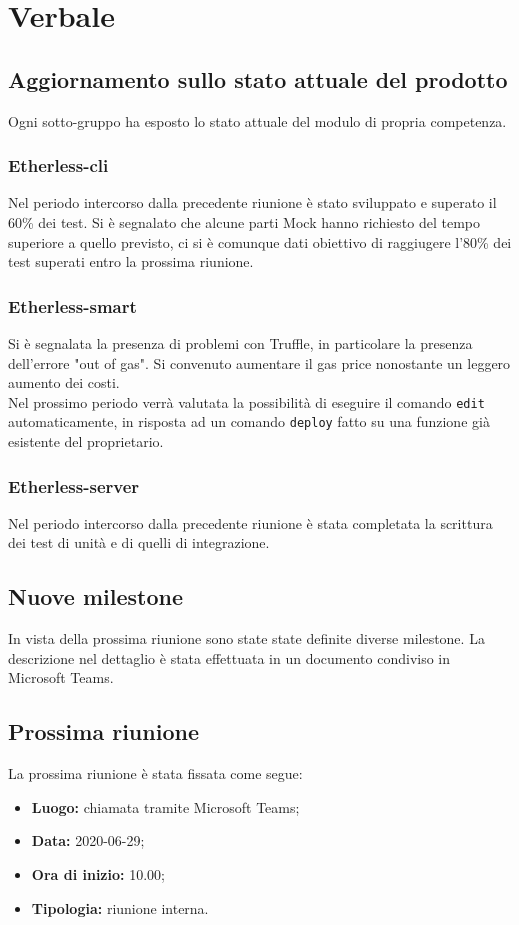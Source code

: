 \section{Verbale}

	\subsection{Aggiornamento sullo stato attuale del prodotto}
		Ogni sotto-gruppo ha esposto lo stato attuale del modulo\textit{} di propria competenza.
		
		\subsubsection{Etherless-cli}
			Nel periodo intercorso dalla precedente riunione è stato sviluppato e superato il 60\% dei test. Si è segnalato che alcune parti Mock\textit{} hanno richiesto del tempo superiore a quello previsto, ci si è comunque dati obiettivo di raggiugere l'80\% dei test superati entro la prossima riunione.
			
		\subsubsection{Etherless-smart}
			Si è segnalata la presenza di problemi con Truffle\textit{}, in particolare la presenza dell'errore "out of gas". Si convenuto aumentare il gas price\textit{} nonostante un leggero aumento dei costi. \\
			Nel prossimo periodo verrà valutata la possibilità di eseguire il comando \texttt{edit} automaticamente, in risposta ad un comando \texttt{deploy} fatto su una funzione già esistente del proprietario.
			
		\subsubsection{Etherless-server}
			Nel periodo intercorso dalla precedente riunione è stata completata la scrittura dei test di unità e di quelli di integrazione.
	
	\subsection{Nuove milestone}
		In vista della prossima riunione sono state state definite diverse milestone\textit{}. La descrizione nel dettaglio è stata effettuata in un documento condiviso in Microsoft Teams.
				
	\subsection{Prossima riunione}
		La prossima riunione è stata fissata come segue:
		\begin{itemize}
			\item \textbf{Luogo:} chiamata tramite Microsoft Teams; 
			\item \textbf{Data:} 2020-06-29;
			\item \textbf{Ora di inizio:} 10.00;
			\item \textbf{Tipologia:} riunione interna.
		\end{itemize}